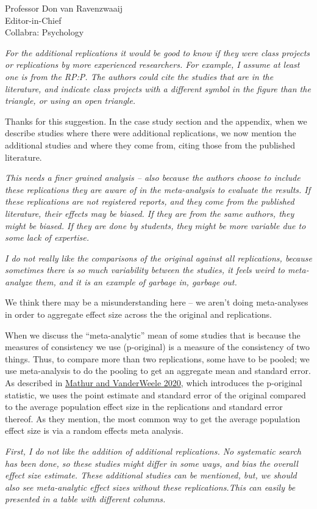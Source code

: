 \documentclass{stanfordletter}
\newcounter{section}
\newcommand{\theysaid}[1]{\begin{leftbar} \noindent 
		\textsl{ #1}\end{leftbar}}
\begin{document}
\begin{letter}{Professor Don van Ravenzwaaij \\ Editor-in-Chief \\ Collabra: Psychology }
	\theysaid{For the additional replications it would be good to know if they were class projects or replications by more experienced researchers. For example, I assume at least one is from the RP:P. The authors could cite the studies that are in the literature, and indicate class projects with a different symbol in the figure than the triangle, or using an open triangle. }
	
	Thanks for this suggestion. In the case study section and the appendix, when we describe studies where there were additional replications, we now mention the additional studies and where they come from, citing those from the published literature. 
	
	
	\theysaid{This needs a finer grained analysis – also because the authors choose to include these replications they are aware of in the meta-analysis to evaluate the results. If these replications are not registered reports, and they come from the published literature, their effects may be biased. If they are from the same authors, they might be biased. If they are done by students, they might be more variable due to some lack of expertise.}
	
	\theysaid{I do not really like the comparisons of the original against all replications, because sometimes there is so much variability between the studies, it feels weird to meta-analyze them, and it is an example of garbage in, garbage out.}
	
	We think there may be a misunderstanding here -- we aren't doing meta-analyses in order to aggregate effect size across the the original and replications. 
	
	When we discuss the ``meta-analytic'' mean of some studies that is because the measures of consistency we use (p-original) is a measure of the consistency of two things. Thus, to compare more than two replications, some have to be pooled; we use meta-analysis to do the pooling to get an aggregate mean and standard error. As described in \href{https://rss.onlinelibrary.wiley.com/doi/full/10.1111/rssa.12572}{Mathur and VanderWeele 2020}, which introduces the p-original statistic, we uses the point estimate and standard error of the original compared to the average population effect size in the replications and standard error thereof. As they mention, the most common way to get the average population effect size is via a random effects meta analysis. 
	
	\theysaid{First, I do not like the addition of additional replications. No systematic search has been done, so these studies might differ in some ways, and bias the overall effect size estimate. These additional studies can be mentioned, but, we should also see meta-analytic effect sizes without these replications.This can easily be presented in a table with different columns.}
	

\end{letter}
\end{document}
